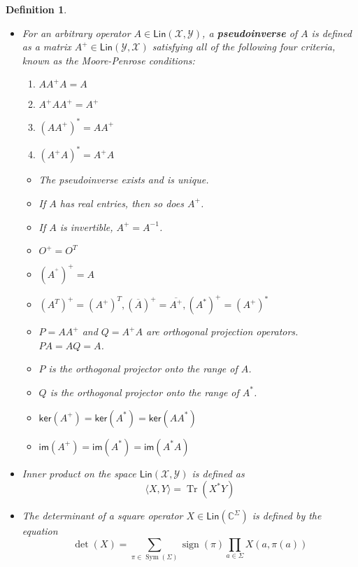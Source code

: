 \documentclass[aps,pra,onecolumn,notitlepage,superscriptaddress]{revtex4-1}
\newcommand{\C}{\mathbb{C}}
\newcommand{\spc}[1]{\mathcal{#1}}
\newcommand{\Lin}{\mathsf{Lin}}
\newcommand{\im}{\mathsf{im}}
\newcommand{\myker}{\mathsf{ker}}
\def\>{\rangle}
\def\<{\langle}
\newcommand{\Tr}{\operatorname{Tr}}
\newcommand{\op}[1]{\operatorname{#1}}
\newtheorem{defi}{Definition}
\begin{document}
\begin{defi}
\begin{itemize}
            \item For an arbitrary operator $A \in \Lin(\spc X,\spc Y)$, a \textbf{pseudoinverse} of $A$ is defined as a matrix $A^+ \in \Lin(\spc Y, \spc X)$ satisfying all of the following four criteria, known as the Moore-Penrose conditions:
            \begin{enumerate}
                \item $AA^+A = A$
                \item $A^+AA^+ = A^+$
                \item $(AA^+)^* = AA^+$
                \item $(A^+A)^* = A^+A$
            \end{enumerate}
            \begin{itemize}
                \item The pseudoinverse exists and is unique.
                \item If $A$ has real entries, then so does $A^+$.
                \item If $A$ is invertible, $A^+ = A^{-1}$.
                \item $O^+ = O^T$
                \item $(A^{^+})^+ = A$
                \item $(A^T)^+ = (A^+)^T, (\overline{A})^+ = \overline{A^+}, (A^*)^+ = (A^+)^*$
                \item $P = AA^+$ and $Q = A^+A$ are orthogonal projection operators. $PA = AQ = A$.
                \item $P$ is the orthogonal projector onto the range of $A$.
                \item $Q$ is the orthogonal projector onto the range of $A^*$.
                \item $\myker(A^+) = \myker(A^*) = \myker(AA^*)$
                \item $\im(A^+) = \im(A^*) = \im(A^*A)$
            \end{itemize}
            

            \item Inner product on the space $\Lin(\spc X,\spc Y)$ is defined as
            \begin{equation}
                \< X,Y \> = \Tr(X^*Y)
            \end{equation}

            \item The determinant of a square operator $X \in \Lin(\C^\Sigma)$ is defined by the equation
            \begin{equation}
                \det(X) = \sum_{\pi \in  \op{Sym}(\Sigma)} \op{sign}(\pi) \prod_{a \in \Sigma} X(a, \pi(a))
            \end{equation}
        \end{itemize}
    \end{defi}
\end{document}
